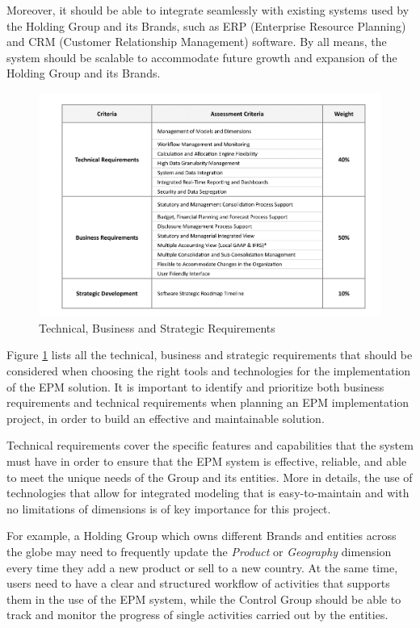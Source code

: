 \documentclass[12pt,a4paper,openright,twoside]{book}
\begin{document}
Moreover, it should be able to integrate seamlessly with existing systems used by the Holding Group and its Brands, such as ERP (Enterprise Resource Planning) and CRM (Customer Relationship Management) software.
%
By all means, the system should be scalable to accommodate future growth and expansion of the Holding Group and its Brands.

\begin{figure}[ht]
	\centering
	\includegraphics[width=\linewidth]{figures/requirements.pdf}
	\caption{Technical, Business and Strategic Requirements}
	\label{fig:requirements}
\end{figure}

Figure \ref{fig:requirements} lists all the technical, business and strategic requirements that should be considered when choosing the right tools and technologies for the implementation of the EPM solution.
%
It is important to identify and prioritize both business requirements and technical requirements when planning an EPM implementation project, in order to build an effective and maintainable solution.

Technical requirements cover the specific features and capabilities that the system must have in order to ensure that the EPM system is effective, reliable, and able to meet the unique needs of the Group and its entities.
%
More in details, the use of technologies that allow for integrated modeling that is easy-to-maintain and with no limitations of dimensions is of key importance for this project.

For example, a Holding Group which owns different Brands and entities across the globe may need to frequently update the \textit{Product} or \textit{Geography} dimension every time they add a new product or sell to a new country.
%
At the same time, users need to have a clear and structured workflow of activities that supports them in the use of the EPM system, while the Control Group should be able to track and monitor the progress of single activities carried out by the entities.
\end{document}

